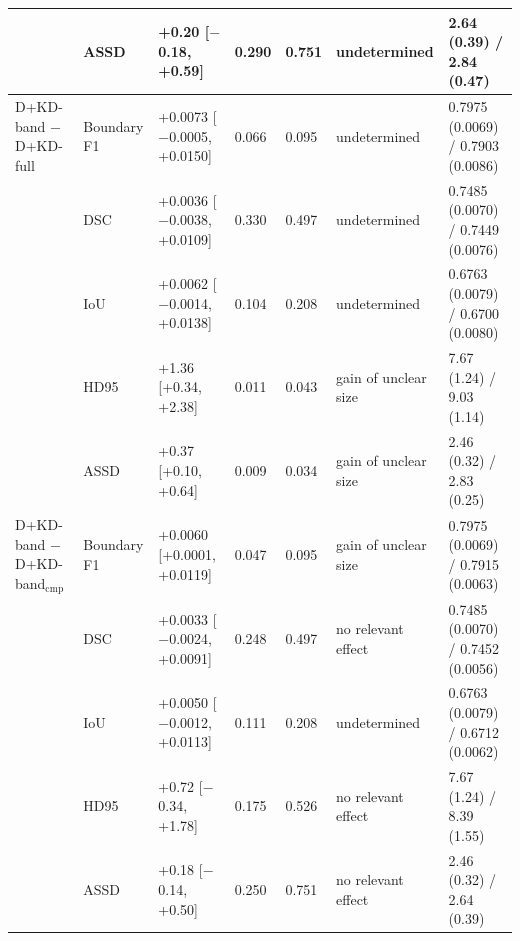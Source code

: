 \begin{tabular}{@{}lllllll@{}}
 & ASSD & +0.20 [$-$0.18, +0.59] & 0.290 & 0.751 & undetermined & 2.64 (0.39) / 2.84 (0.47) \\
\midrule
D+KD-band $-$ D+KD-full & Boundary F1 & +0.0073 [$-$0.0005, +0.0150] & 0.066 & 0.095 & undetermined & 0.7975 (0.0069) / 0.7903 (0.0086) \\
 & DSC & +0.0036 [$-$0.0038, +0.0109] & 0.330 & 0.497 & undetermined & 0.7485 (0.0070) / 0.7449 (0.0076) \\
 & IoU & +0.0062 [$-$0.0014, +0.0138] & 0.104 & 0.208 & undetermined & 0.6763 (0.0079) / 0.6700 (0.0080) \\
 & HD95 & +1.36 [+0.34, +2.38] & 0.011 & 0.043 & gain of unclear size & 7.67 (1.24) / 9.03 (1.14) \\
 & ASSD & +0.37 [+0.10, +0.64] & 0.009 & 0.034 & gain of unclear size & 2.46 (0.32) / 2.83 (0.25) \\
\midrule
D+KD-band $-$ D+KD-band$_{\mathrm{cmp}}$ & Boundary F1 & +0.0060 [+0.0001, +0.0119] & 0.047 & 0.095 & gain of unclear size & 0.7975 (0.0069) / 0.7915 (0.0063) \\
 & DSC & +0.0033 [$-$0.0024, +0.0091] & 0.248 & 0.497 & no relevant effect & 0.7485 (0.0070) / 0.7452 (0.0056) \\
 & IoU & +0.0050 [$-$0.0012, +0.0113] & 0.111 & 0.208 & undetermined & 0.6763 (0.0079) / 0.6712 (0.0062) \\
 & HD95 & +0.72 [$-$0.34, +1.78] & 0.175 & 0.526 & no relevant effect & 7.67 (1.24) / 8.39 (1.55) \\
 & ASSD & +0.18 [$-$0.14, +0.50] & 0.250 & 0.751 & no relevant effect & 2.46 (0.32) / 2.64 (0.39) \\
\bottomrule
\end{tabular}
